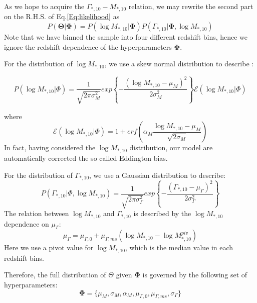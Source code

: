 \documentclass[fleqn,usenatbib]{mnras}
\begin{document}
\par As we hope to acquire the $\Gamma_{*,10} -M_{*,10}$  relation, we may rewrite the second part on the R.H.S. of Eq.\ref{Eq:likelihood} as
\begin{equation}
    P(\mathbf{\Theta}|\mathbf{\Phi}) =  P(\log M_{*,10}|\mathbf{\Phi})P(\Gamma_{*,10}|\mathbf{\Phi},\log M_{*,10})
\end{equation}
Note that we have binned the sample into four different redshift bins, hence we ignore the redshift dependence of the hyperparameters $\mathbf{\Phi}$.
\par  For the distribution of $\log M_{*,10}$, we use a skew normal distribution to describe : 
\begin{small}
   \begin{equation}
        P\left(\log M_{*,10}|\Phi\right) = \frac{1}{\sqrt{2\pi\sigma^2_M}}exp\left\{-\frac{(\log M_{*,10} - \mu_M)^2}{2\sigma_M^2}\right\}\mathcal{E}\left(\log M_{*,10} | \Phi\right)
    \end{equation} 
\end{small}
where
\begin{equation}
    \mathcal{E}\left(\log M_{*,10} | \Phi\right) = 1 + erf\left(\alpha_M\frac{\log M_{*,10} - \mu_M}{\sqrt{2\sigma_M}}\right)
\end{equation}
In fact, having considered the $\log M_{*,10}$ distribution, our model are automatically corrected the so called Eddington bias. 
\par For the distribution of $\Gamma_{*,10}$, we use a Gaussian distribution to describe:
\begin{equation}
    P\left(\Gamma_{*,10}|\Phi,\log M_{*,10}\right) = \frac{1}{\sqrt{2\pi\sigma^2_{\Gamma}}}exp\left\{-\frac{(\Gamma_{*,10} - \mu_{\Gamma})^2}{2\sigma_{\Gamma}^2}\right\}
\end{equation}
The relation between $\log M_{*,10}$ and $\Gamma_{*,10}$ is described by the $\log M_{*,10}$ dependence on $\mu_\Gamma$:
\begin{equation}
    \label{eq:mg_relation}
    \mu_{\Gamma} = \mu_{\Gamma,0} + \mu_{\Gamma, ms}\left(\log M_{*,10} - \log M^{piv}_{*,10}\right)
\end{equation}
Here we use a pivot value for $\log M_{*,10}$, which is the median value in each redshift bins.
\par Therefore, the full distribution of $\Theta$ given $\mathbf{\Phi}$ is governed by the following set of hyperparameters:
\begin{equation}
    \mathbf{\Phi} = \{ \mu_M, \sigma_M, \alpha_M, \mu_{\Gamma,0}, \mu_{\Gamma, ms}, \sigma_{\Gamma} \}
\end{equation}
\end{document}
